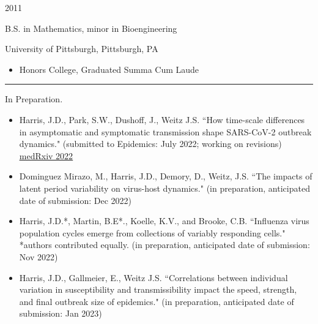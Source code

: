 \documentclass[a4paper,10pt]{article}
\newlength{\cvcolumngapwidth}
\newlength{\cvleftcolumnwidth}
\newlength{\cvrightcolumnwidth}
\newcommand{\cvsectionstyle}[1]{{\normalsize\cvsectionfont\textcolor{cvsectioncolor}{#1}}}
\newcommand{\cvtitlestyle}[1]{{\large\cvtitlefont\textcolor{cvtitlecolor}{#1}}}
\newcommand{\cvdurationstyle}[1]{{\small\cvdurationfont\textcolor{cvdurationcolor}{#1}}}
\newlength{\cvafteritemskipamount}
\newlength{\cvaftersectionskipamount}
\newlength{\cvbetweensectionandheadingextraskipamount}
\newlength{\cvaftertitleskipamount}
\newlength{\cvparskip}
\newcommand{\cvsection}[1]{
            \begin{minipage}[t]{\cvleftcolumnwidth}
                \raggedleft\cvsectionstyle{#1}
            \end{minipage}%
            \hspace{\cvcolumngapwidth}%
            \begin{minipage}[t]{\cvrightcolumnwidth}
                \textcolor{cvrulecolor}{\rule{\cvrightcolumnwidth}{0.3mm}}
            \end{minipage}
        
            \vspace{\cvaftersectionskipamount}
        }
\newcommand{\cvitem}[2]{
            \begin{minipage}[t]{\cvleftcolumnwidth}
                \raggedleft #1
            \end{minipage}%
            \hspace{\cvcolumngapwidth}%
            \begin{minipage}[t]{\cvrightcolumnwidth}
                \setlength{\parskip}{\cvparskip} #2
            \end{minipage}
        
            \vspace{\cvafteritemskipamount}
        }
\newcommand{\cvtitle}[1]{
            \cvtitlestyle{#1}
        
            \vspace{\cvaftertitleskipamount}
            \vspace{-\cvparskip}
        }
\begin{document}
        \cvitem{
            \cvdurationstyle{2011}
        }{
            \cvtitle{B.S. in Mathematics, minor in Bioengineering}
        	University of Pittsburgh, Pittsburgh, PA
            \begin{itemize}[leftmargin=*]
                \item  Honors College, Graduated Summa Cum Laude
            \end{itemize}
        }
        
        \cvsection{PUBLICATIONS}
        
        \cvitem{
            \cvdurationstyle{In Preparation.}
        }{
            \begin{itemize}[leftmargin=*]
            	\item Harris, J.D., Park, S.W., Dushoff, J., Weitz J.S. ``How time-scale differences in asymptomatic and symptomatic transmission shape SARS-CoV-2 outbreak dynamics." (submitted to Epidemics: July 2022; working on revisions)
	\href{https://www.medrxiv.org/content/10.1101/2022.04.21.22274139.abstract}{\underline{medRxiv 2022}}

	        	\item Dominguez Mirazo, M., Harris, J.D., Demory, D., Weitz, J.S. ``The impacts of latent period variability on virus-host dynamics." (in preparation, anticipated date of submission: Dec 2022)	
	
        	\item Harris, J.D.*, Martin, B.E*., Koelle, K.V., and Brooke, C.B. ``Influenza virus population cycles emerge from collections of variably responding cells." *authors contributed equally. (in preparation, anticipated date of submission: Nov 2022)
	
	\item Harris, J.D., Gallmeier, E., Weitz J.S. ``Correlations between individual variation in susceptibility and transmissibility impact the speed, strength, and final outbreak size of epidemics." (in preparation, anticipated date of submission: Jan 2023)

	
            \end{itemize}
        }
        
\end{document}
